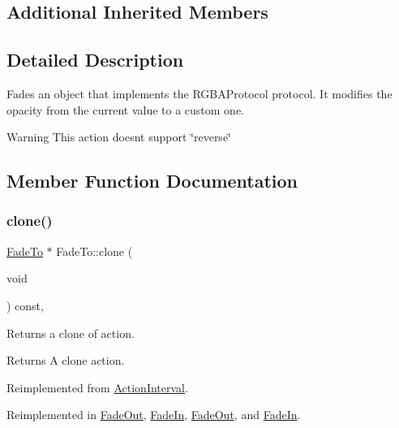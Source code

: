 \subsection*{Additional Inherited Members}


\subsection{Detailed Description}
Fades an object that implements the R\+G\+B\+A\+Protocol protocol. It modifies the opacity from the current value to a custom one. 

\begin{DoxyWarning}{Warning}
This action doesn\textquotesingle{}t support \char`\"{}reverse\char`\"{} 
\end{DoxyWarning}


\subsection{Member Function Documentation}
\mbox{\label{classFadeTo_a662485a4513a6e717db8df6c6065c284}} 
\subsubsection{\texorpdfstring{clone()}{clone()}\hspace{0.1cm}{\footnotesize\ttfamily [1/2]}}
{\footnotesize\ttfamily \hyperlink{classFadeTo}{Fade\+To} $\ast$ Fade\+To\+::clone (\begin{DoxyParamCaption}\item[{void}]{ }\end{DoxyParamCaption}) const\hspace{0.3cm}{\ttfamily [override]}, {\ttfamily [virtual]}}

Returns a clone of action.

\begin{DoxyReturn}{Returns}
A clone action. 
\end{DoxyReturn}


Reimplemented from \hyperlink{classActionInterval_abc93ce0c2f54a90eb216a7803f25f44a}{Action\+Interval}.



Reimplemented in \hyperlink{classFadeOut_a03d1d3960ed0439bb40f120f14f1a4b5}{Fade\+Out}, \hyperlink{classFadeIn_a11f3037a54e9cb96655fe74f5f007c06}{Fade\+In}, \hyperlink{classFadeOut_af06dabca5e73a8ed67560c2540bbbb1f}{Fade\+Out}, and \hyperlink{classFadeIn_ab6e6999c3e68cc9157acabd0a7db06d5}{Fade\+In}.

